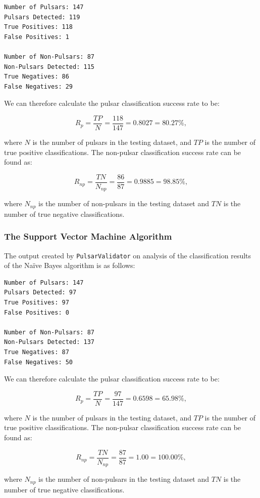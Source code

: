 \documentclass{article}
\begin{document}
\begin{lstlisting}[numbers=none]
Number of Pulsars: 147
Pulsars Detected: 119
True Positives: 118
False Positives: 1

Number of Non-Pulsars: 87
Non-Pulsars Detected: 115
True Negatives: 86
False Negatives: 29
\end{lstlisting}

We can therefore calculate the pulsar classification success rate to be:

$$ R_{p} = \frac{TP}{N} = \frac{118}{147} =  0.8027 = 80.27\%,$$

where $N$ is the number of pulsars in the testing dataset, and $TP$ is the number of true positive classifications. The non-pulsar classification success rate can be found as:

$$R_{np} = \frac{TN}{N_{np}} = \frac{86}{87} = 0.9885 = 98.85\%,$$

where $N_{np}$ is the number of non-pulsars in the testing dataset and $TN$ is the number of true negative classifications.

\subsubsection{The Support Vector Machine Algorithm}

The output created by \verb|PulsarValidator| on analysis of the classification results of the Naïve Bayes algorithm is as follows:

\begin{lstlisting}[numbers=none]
Number of Pulsars: 147
Pulsars Detected: 97
True Positives: 97
False Positives: 0

Number of Non-Pulsars: 87
Non-Pulsars Detected: 137
True Negatives: 87
False Negatives: 50
\end{lstlisting}

We can therefore calculate the pulsar classification success rate to be:

$$ R_{p} = \frac{TP}{N} = \frac{97}{147} =  0.6598 = 65.98\%,$$

where $N$ is the number of pulsars in the testing dataset, and $TP$ is the number of true positive classifications. The non-pulsar classification success rate can be found as:

$$R_{np} = \frac{TN}{N_{np}} = \frac{87}{87} = 1.00 = 100.00\%,$$

where $N_{np}$ is the number of non-pulsars in the testing dataset and $TN$ is the number of true negative classifications.
\end{document}
